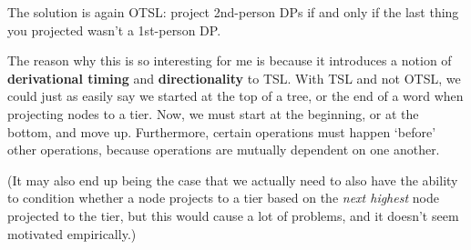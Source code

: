 The solution is again OTSL: project 2nd-person DPs if and only if the last thing you projected wasn't a 1st-person DP.

The reason why this is so interesting for me is because it introduces a notion of \textbf{derivational timing} and \textbf{directionality} to TSL. With TSL and not OTSL, we could just as easily say we started at the top of a tree, or the end of a word when projecting nodes to a tier. Now, we must start at the beginning, or at the bottom, and move up. Furthermore, certain operations must happen `before' other operations, because operations are mutually dependent on one another.

(It may also end up being the case that we actually need to also have the ability to condition whether a node projects to a tier based on the \textit{next highest} node projected to the tier, but this would cause a lot of problems, and it doesn't seem motivated empirically.)
